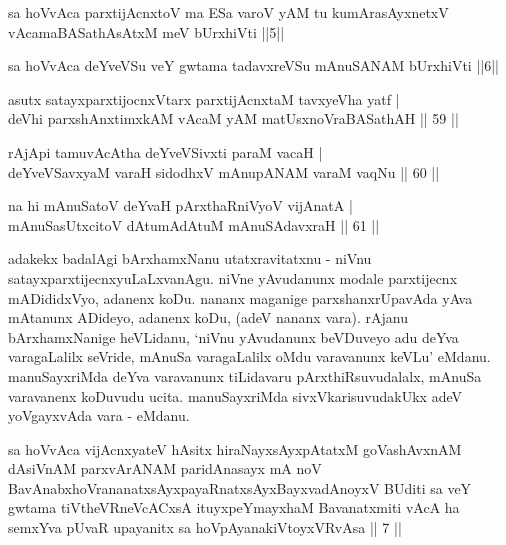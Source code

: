 
\begin{shl}
sa hoVvAca parxtijAcnxtoV ma ESa varoV yAM tu kumArasAyxnetxV vAcamaBASathAsAtxM meV bUrxhiVti ||5||
\end{shl}

\begin{shl}
sa hoVvAca deYveVSu veY gwtama tadavxreVSu mAnuSANAM bUrxhiVti ||6||
\end{shl}

\begin{shl}
asutx satayxparxtijocnxV\s tarx parxtijAcnxtaM tavxyeVha yatf | \\
deVhi parxshAnxtimxkAM vAcaM yAM matUsxnoVraBASathAH \hfill|| 59 || 
\end{shl}

\begin{shl}
rAjA\s pi tamuvAcAtha deYveVSivxti paraM vacaH | \\
deYveVSavxyaM varaH sidodhxV mAnupANAM varaM vaqNu \hfill|| 60 || 
\end{shl}

\begin{shl}
na hi mAnuSatoV deYvaH pArxthaRniVyoV vijAnatA | \\
mAnuSasUtxcitoV dAtumAdAtuM mAnuSAdavxraH \hfill|| 61 || 
\end{shl}

\begin{artha}
adakekx badalAgi bArxhamxNanu utatxravitatxnu - niVnu 
satayxparxtijecnxyuLaLxvanAgu. niVne yAvudanunx modale parxtijecnx 
mADididxVyo, adanenx koDu. nananx maganige parxshanxrUpavAda yAva 
mAtanunx ADideyo, adanenx koDu, (adeV nananx vara). rAjanu 
bArxhamxNanige heVLidanu, `niVnu yAvudanunx beVDuveyo adu deYva 
varagaLalilx seVride, mAnuSa varagaLalilx oMdu varavanunx keVLu' 
eMdanu. manuSayxriMda deYva varavanunx tiLidavaru pArxthiRsuvudalalx, 
mAnuSa varavanenx koDuvudu ucita. manuSayxriMda sivxVkarisuvudakUkx 
adeV yoVgayxvAda vara - eMdanu.
\end{artha}


\begin{shl}
sa hoVvAca vijAcnxyateV hAsitx hiraNayxsAyxpAtatxM goVashAvxnAM dAsiVnAM parxvArANAM paridAnasayx mA noV BavAnabxhoVrananatxsAyxpayaRnatxsAyxBayxvadAnoyxV BUditi sa veY gwtama tiVtheVRneVcACxsA ituyxpeYmayxhaM Bavanatxmiti vAcA ha semxYva pUvaR upayanitx sa hoVpAyanakiVtoyxVRvAsa || 7 ||
\end{shl}

